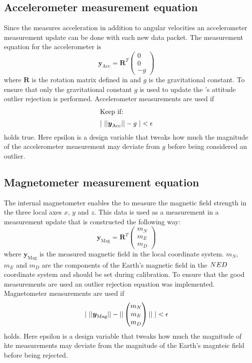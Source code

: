 \subsection{Accelerometer measurement equation}
Since the \abbrIMU measures acceleration in addition to angular velocities an accelerometer measurement update can be done with each new \abbrIMU data packet. The measurement equation for the accelerometer is
\begin{equation}
\boldsymbol{y}_{\text{Acc}} =
    \boldsymbol{R}^T
    \begin{pmatrix}
    0\\
    0\\
    -g
    \end{pmatrix}
\end{equation}
    where $\boldsymbol{R}$ is the rotation matrix defined in  and $g$ is the gravitational constant. To ensure that only the gravitational constant $g$ is used to update the \abbrROV's attitude outlier rejection is performed. Accelerometer measurements are used if 
\begin{align*}
    \intertext{Keep if: }
    |~||
    \boldsymbol{y}_{\text{Acc}}
||
    -g
     ~| < \epsilon
\end{align*} holds true.
Here epsilon is a design variable that tweaks how much the magnitude of the accelerometer measurement may deviate from $g$ before being considered an outlier.

\subsection{Magnetometer measurement equation}
The internal magnetometer enables the \abbrROV to measure the magnetic field strength in the three local axes $x$, $y$ and $z$. This data is used as a measurement in a measurement update that is constructed the following way:
\begin{equation}
\boldsymbol{y}_{\text{Mag}} = 
    \boldsymbol{R}^T
    \begin{pmatrix}
        m_N\\
        m_E\\
        m_D
    \end{pmatrix}
\end{equation}
where $\boldsymbol{y}_{\text{Mag}}$ is the measured magnetic field in the local coordinate system. $m_N$, $m_E$ and $m_D$ are the components of the Earth's magnetic field in the $NED$ coordinate system and should be set during calibration.
To ensure that the good measurements are used an outlier rejection equation was implemented. Magnetometer measurements are used if 
\begin{equation}
        |~||
\boldsymbol{y}_{\text{Mag}}||
    -
    ||
    \begin{pmatrix}
        m_N\\
        m_E\\
        m_D
    \end{pmatrix}||
     ~| < \epsilon
\end{equation}
holds. Here epsilon is a design variable that tweaks how much the magnitude of hte measurements may deviate from the magnitude of the Earth's magnteic field before being rejected.

